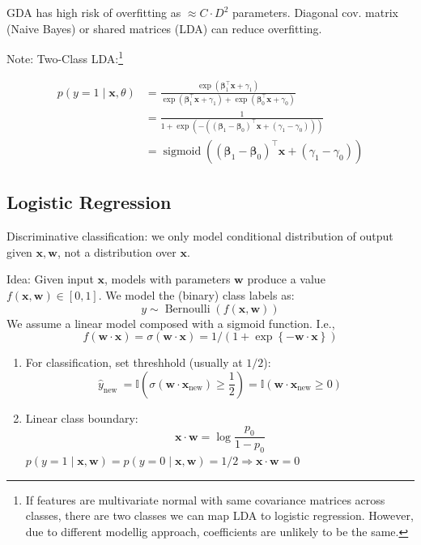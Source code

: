 \documentclass[11pt, %
	oneside, %
	english, %
	onehalfspacing, %
	parskip, %
	]{article} %
\theoremstyle{definition}
\begin{document}
GDA has high risk of overfitting as $\approx C \cdot D^2$ parameters. Diagonal cov. matrix (Naive Bayes) or shared matrices (LDA) can reduce overfitting.

Note: Two-Class LDA:\footnote{If features are multivariate normal with same covariance matrices across classes, there are two classes we can map LDA to logistic regression. However, due to different modellig approach, coefficients are unlikely to be the same.}

\begin{equation}\label{eq.twoclasslda}
	\begin{aligned}
		p(y=1 \mid \mathbf{x}, \theta) & =\frac{\exp \left(\boldsymbol{\beta}_1^{\top} \mathbf{x}+\gamma_1\right)}{\exp \left(\boldsymbol{\beta}_1^{\top} \mathbf{x}+\gamma_1\right)+\exp \left(\boldsymbol{\beta}_0^{\top} \mathbf{x}+\gamma_0\right)} \\
		& =\frac{1}{1+\exp \left(-\left(\left(\boldsymbol{\beta}_1-\boldsymbol{\beta}_0\right)^{\top} \mathbf{x}+\left(\gamma_1-\gamma_0\right)\right)\right)} \\
		& =\operatorname{sigmoid}\left(\left(\boldsymbol{\beta}_1-\boldsymbol{\beta}_0\right)^{\top} \mathbf{x}+\left(\gamma_1-\gamma_0\right)\right)
	\end{aligned}
\end{equation}

\subsection{Logistic Regression}

Discriminative classification: we only model conditional distribution of output given $\mathbf{x}, \mathbf{w}$, not a distribution over $\mathbf{x}$.

Idea: Given input $\mathbf{x}$, models with parameters $\mathbf{w}$ produce a value $f(\mathbf{x}, \mathbf{w}) \in[0,1]$. We model the (binary) class labels as:
$$
y \sim \operatorname{Bernoulli}(f(\mathbf{x}, \mathbf{w}))
$$
We assume a linear model composed with a sigmoid function. I.e.,
\begin{equation*}
	f(\mathbf{w} \cdot \mathbf{x}) = \sigma(\mathbf{w} \cdot \mathbf{x}) = 1 / (1+\exp \left\{- \mathbf{w} \cdot \mathbf{x}\right\})
\end{equation*}

\begin{enumerate}
	\item For classification, set threshhold (usually at $1 / 2$):
	\begin{equation*}
		\widehat{y}_{\text {new }}=\mathbb{I}\left(\sigma\left(\mathbf{w} \cdot \mathbf{x}_{\mathrm{new}}\right) \geq \frac{1}{2}\right)=\mathbb{I}\left(\mathbf{w} \cdot \mathbf{x}_{\mathrm{new}} \geq 0\right)
	\end{equation*}
	\item Linear class boundary:
	\begin{equation*}
		\mathbf{x} \cdot \mathbf{w}=\log \frac{p_0}{1-p_0}
	\end{equation*}
	$p(y=1 \mid \mathbf{x}, \mathbf{w})=p(y=0 \mid \mathbf{x}, \mathbf{w})=1 / 2 \Rightarrow \mathbf{x} \cdot \mathbf{w}=0$
\end{enumerate}
\end{document}
